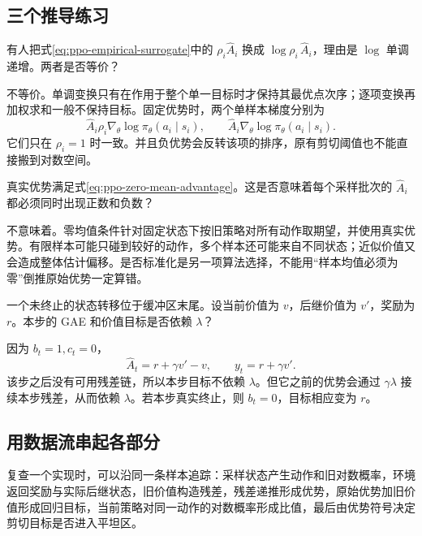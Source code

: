\documentclass[UTF8,12pt,a4paper,fontset=fandol]{ctexart}
\begin{document}
\subsection{三个推导练习}

\begin{example}[概率比不能随意换成对数概率比]
有人把式\eqref{eq:ppo-empirical-surrogate}中的
$\rho_i\widehat A_i$ 换成
$\log\rho_i\,\widehat A_i$，理由是 $\log$ 单调递增。两者是否等价？
\end{example}
\begin{solve}
不等价。单调变换只有在作用于整个单一目标时才保持其最优点次序；逐项变换再加权求和一般不保持目标。固定优势时，两个单样本梯度分别为
\[
  \widehat A_i\rho_i\nabla_\theta\log\pi_\theta(a_i\mid s_i),
  \qquad
  \widehat A_i\nabla_\theta\log\pi_\theta(a_i\mid s_i).
\]
它们只在 $\rho_i=1$ 时一致。并且负优势会反转该项的排序，原有剪切阈值也不能直接搬到对数空间。
\end{solve}

\begin{example}[一批全是正优势是否合理]
真实优势满足式\eqref{eq:ppo-zero-mean-advantage}。这是否意味着每个采样批次的 $\widehat A_i$ 都必须同时出现正数和负数？
\end{example}
\begin{solve}
不意味着。零均值条件针对固定状态下按旧策略对所有动作取期望，并使用真实优势。有限样本可能只碰到较好的动作，多个样本还可能来自不同状态；近似价值又会造成整体估计偏移。是否标准化是另一项算法选择，不能用“样本均值必须为零”倒推原始优势一定算错。
\end{solve}

\begin{example}[采样块末尾的价值目标]
一个未终止的状态转移位于缓冲区末尾。设当前价值为 $v$，后继价值为 $v'$，奖励为 $r$。本步的 GAE 和价值目标是否依赖 $\lambda$？
\end{example}
\begin{solve}
因为 $b_t=1,c_t=0$，
\[
  \widehat A_t=r+\gamma v'-v,\qquad
  y_t=r+\gamma v'.
\]
该步之后没有可用残差链，所以本步目标不依赖 $\lambda$。但它之前的优势会通过 $\gamma\lambda$ 接续本步残差，从而依赖 $\lambda$。若本步真实终止，则 $b_t=0$，目标相应变为 $r$。
\end{solve}

\subsection{用数据流串起各部分}

复查一个实现时，可以沿同一条样本追踪：采样状态产生动作和旧对数概率，环境返回奖励与实际后继状态，旧价值构造残差，残差递推形成优势，原始优势加旧价值形成回归目标，当前策略对同一动作的对数概率形成比值，最后由优势符号决定剪切目标是否进入平坦区。
\end{document}
